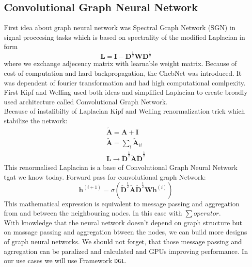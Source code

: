 \subsection{Convolutional Graph Neural Network}
First idea about graph neural network was Spectral Graph Network (SGN) \cite{} in signal proccesing tasks which is based on spectrality of the modified  Laplacian in form \begin{equation}
	\mathbf{L}= \mathbf{I} - \mathbf{D}^{\frac{1}{2}}\mathbf{W}\mathbf{D}^{\frac{1}{2}} 
\end{equation}where we exchange adjecency matrix with learnable weight matrix.
Because of cost of computation and hard backpropagation, the ChebNet was introduced. 
It was dependent of fourier transformation and had high computational comlpexity.
First Kipf and Welling used both ideas and simplified Laplacian to create broadly used architecture called Convolutional Graph Network.\\Because of instalibilty of Laplacian Kipf and Welling \cite{} renormalization trick which stabilize the network:
\begin{eqnarray}
	\tilde{\mathbf{A}} = \mathbf{A} +\mathbf{I}\\
	\tilde{\mathbf{A}} = \sum_i \tilde{\mathbf{A}}_{ii}\\
	\mathbf{L}\rightarrow\tilde{\mathbf{D}}^{\frac{1}{2}}\tilde{\mathbf{A}}\tilde{\mathbf{D}}^{\frac{1}{2}}
\end{eqnarray} 
This renormalised Laplacian is a base of Convolutional Graph Neural Network tgat we know today.
Forward pass for convolutional graph Network:
\begin{equation}
	\mathbf{h}^{(i+1)}=\sigma(\tilde{\mathbf{D}}^{\frac{1}{2}}\tilde{\mathbf{A}}\tilde{\mathbf{D}}^{\frac{1}{2}}\mathbf{W}\mathbf{h}^{(i)})
\end{equation}
This mathematical expression is equivalent to message passing and aggregation from and between the neighbouring nodes. In this case with $\sum operator$.\\ 
With knowledge that the neural network doesn't depend on graph structure but on massage passing and aggregation btween the nodes, we can build more designs of graph neural networks. We should not forget, that those message passing and agrregation can be paralized and calculated and GPUs improving performance. In our use cases we will use Framework \texttt{DGL}.


